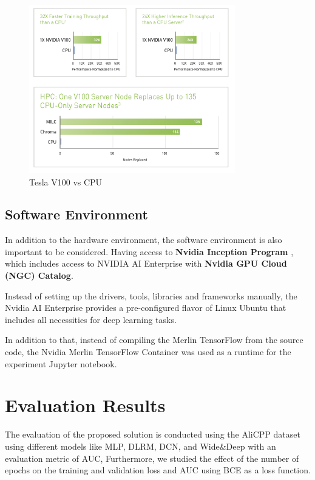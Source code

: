 \begin{figure}[H]
    \centering
    \includegraphics[width=0.8\textwidth]{assets/v100-vs-cpu.png}
    \caption[Tesla V100 vs CPU]{Tesla V100 vs CPU \cite{NvidiaV100DataSheet}}
    \label{fig:V100vsCPU}
\end{figure}

\subsection{Software Environment}

In addition to the hardware environment, the software environment is also important to be considered.
Having access to \textbf{Nvidia Inception Program} \cite{NvidiaStartups}, 
which includes access to NVIDIA AI Enterprise \cite{NvidiaAiEnterprise} with \textbf{Nvidia GPU Cloud (NGC) Catalog}\cite{NvidiaNGC}.

Instead of setting up the drivers, tools, libraries and frameworks manually, 
the Nvidia AI Enterprise provides a pre-configured flavor of Linux Ubuntu that includes all necessities for deep learning tasks.

In addition to that, instead of compiling the Merlin TensorFlow from the source code, 
the Nvidia Merlin TensorFlow Container \cite{NvidiaMerlinTf} was used as a runtime for the experiment Jupyter notebook.



\section{Evaluation Results}
The evaluation of the proposed solution is conducted using the AliCPP dataset using different models like MLP, DLRM, DCN, and Wide\&Deep with an evaluation metric of AUC, Furthermore, we studied the effect of the number of epochs on the training and validation loss and AUC using BCE as a loss function.


